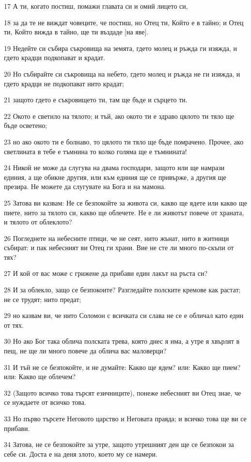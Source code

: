 \par 17 А ти, когато постиш, помажи главата си и омий лицето си,
\par 18 за да те не виждат човеците, че постиш, но Отец ти, Който е в тайно; и Отец ти, Който вижда в тайно, ще ти въздаде [на яве].
\par 19 Недейте си събира съкровища на земята, гдето молец и ръжда ги изяжда, и гдето крадци подкопават и крадат.
\par 20 Но събирайте си съкровища на небето, гдето молец и ръжда не ги изяжда, и гдето крадци не подкопават нито крадат;
\par 21 защото гдето е съкровището ти, там ще бъде и сърцето ти.
\par 22 Окото е светило на тялото; и тъй, ако окото ти е здраво цялото ти тяло ще бъде осветено;
\par 23 но ако окото ти е болнаво, то цялото ти тяло ще бъде помрачено. Прочее, ако светлината в тебе е тъмнина то колко голяма ще е тъмнината!
\par 24 Никой не може да слугува на двама господари, защото или ще намрази единия, а ще обикне другия, или към единия ще се привърже, а другия ще презира. Не можете да слугувате на Бога и на мамона.
\par 25 Затова ви казвам: Не се безпокойте за живота си, какво ще ядете или какво ще пиете, нито за тялото си, какво ще облечете. Не е ли животът повече от храната, и тялото от облеклото?
\par 26 Погледнете на небесните птици, че не сеят, нито жънат, нито в житници събират: и пак небесният ви Отец ги храни. Вие не сте ли много по-скъпи от тях?
\par 27 И кой от вас може с грижене да прибави един лакът на ръста си?
\par 28 И за облекло, защо се безпокоите? Разгледайте полските кремове как растат; не се трудят; нито предат;
\par 29 но казвам ви, че нито Соломон с всичката си слава не се е обличал като един от тях.
\par 30 Но ако Бог така облича полската трева, която днес я има, а утре я хвърлят в пещ, не ще ли много повече да облича вас маловерци?
\par 31 И тъй не се безпокойте, и не думайте: Какво ще ядем? или: Какво ще пием? или: Какво ще облечем?
\par 32 (Защото всичко това търсят езичниците), понеже небесният ви Отец знае, че се нуждаете от всичко това.
\par 33 Но първо търсете Неговото царство и Неговата правда; и всичко това ще ви се прибави.
\par 34 Затова, не се безпокойте за утре, защото утрешният ден ще се безпокои за себе си. Доста е на деня злото, което му се намери.

